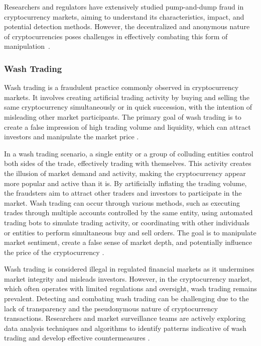 Researchers and regulators have extensively studied pump-and-dump fraud in cryptocurrency markets, aiming to understand
its characteristics, impact, and potential detection methods. However, the decentralized and anonymous nature of cryptocurrencies
poses challenges in effectively combating this form of manipulation~\cite{jin2020pump, yang2019pump}.

\subsubsection{Wash Trading}
Wash trading is a fraudulent practice commonly observed in cryptocurrency markets. It involves creating artificial trading
activity by buying and selling the same cryptocurrency simultaneously or in quick succession, with the intention of misleading
other market participants. The primary goal of wash trading is to create a false impression of high trading volume and liquidity,
which can attract investors and manipulate the market price \cite{gandal2018price}.

In a wash trading scenario, a single entity or a group of colluding entities control both sides of the trade, effectively
trading with themselves. This activity creates the illusion of market demand and activity, making the cryptocurrency appear
more popular and active than it is. By artificially inflating the trading volume, the fraudsters aim to attract other traders
and investors to participate in the market. Wash trading can occur through various methods, such as executing trades through
multiple accounts controlled by the same entity, using automated trading bots to simulate trading activity, or coordinating
with other individuals or entities to perform simultaneous buy and sell orders. The goal is to manipulate market sentiment,
create a false sense of market depth, and potentially influence the price of the cryptocurrency \cite{edelman2018detecting}.

Wash trading is considered illegal in regulated financial markets as it undermines market integrity and misleads investors.
However, in the cryptocurrency market, which often operates with limited regulations and oversight, wash trading remains
prevalent. Detecting and combating wash trading can be challenging due to the lack of transparency and the pseudonymous
nature of cryptocurrency transactions. Researchers and market surveillance teams are actively exploring data analysis
techniques and algorithms to identify patterns indicative of wash trading and develop effective countermeasures
\cite{gandal2018price, edelman2018detecting}.

